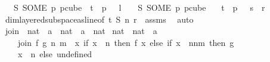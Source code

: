 \begin{isabellebody}
\ \ {\isasymchi}\ {\isacharparenleft}{\kern0pt}S\ {\isacharparenleft}{\kern0pt}SOME\ p{\isachardot}{\kern0pt}\ p{\isasymin}cube\ {}\ {\isacharparenleft}{\kern0pt}t{\isacharplus}{\kern0pt}{}{\isacharparenright}{\kern0pt}\ {\isasymand}\ p\ {}\ {\isacharequal}{\kern0pt}\ l{\isacharparenright}{\kern0pt}{\isacharparenright}{\kern0pt}\ {\isasymand}\ \ {\isasymchi}\ {\isacharparenleft}{\kern0pt}S\ {\isacharparenleft}{\kern0pt}SOME\ p{\isachardot}{\kern0pt}\ p{\isasymin}cube\ {}\isanewline
\ \ {\isacharparenleft}{\kern0pt}t{\isacharplus}{\kern0pt}{}{\isacharparenright}{\kern0pt}\ {\isasymand}\ p\ {}\ {\isacharequal}{\kern0pt}\ s{\isacharparenright}{\kern0pt}{\isacharparenright}{\kern0pt}\ {\isacharless}{\kern0pt}\ r{\isachardoublequoteclose}\isanewline
%
\isadelimproof
\ \ %
\endisadelimproof
%
\isatagproof
{}\isamarkupfalse%
\ dim{}{\isacharunderscore}{\kern0pt}layered{\isacharunderscore}{\kern0pt}subspace{\isacharunderscore}{\kern0pt}as{\isacharunderscore}{\kern0pt}line{\isacharbrackleft}{\kern0pt}of\ t\ S\ n\ r\ {\isasymchi}{\isacharbrackright}{\kern0pt}\ assms\ \isamarkupfalse%
\ auto%
\endisatagproof
{\isafoldproof}%
%
\isadelimproof
\ \ \isanewline
%
\endisadelimproof
\isanewline
{}\isamarkupfalse%
\ join\ {\isacharcolon}{\kern0pt}{\isacharcolon}{\kern0pt}\ {\isachardoublequoteopen}{\isacharparenleft}{\kern0pt}nat\ {\isasymRightarrow}\ {\isacharprime}{\kern0pt}a{\isacharparenright}{\kern0pt}\ {\isasymRightarrow}\ {\isacharparenleft}{\kern0pt}nat\ {\isasymRightarrow}\ {\isacharprime}{\kern0pt}a{\isacharparenright}{\kern0pt}\ {\isasymRightarrow}\ nat\isanewline
{\isasymRightarrow}\ nat\ {\isasymRightarrow}\ {\isacharparenleft}{\kern0pt}nat\ {\isasymRightarrow}\ {\isacharprime}{\kern0pt}a{\isacharparenright}{\kern0pt}{\isachardoublequoteclose}\isanewline
\ \ \isanewline
\ \ \ \ {\isachardoublequoteopen}join\ f\ g\ n\ m\ {\isasymequiv}\ {\isacharparenleft}{\kern0pt}{\isasymlambda}x{\isachardot}{\kern0pt}\ if\ x\ {\isasymin}\ {\isacharbraceleft}{\kern0pt}{\isachardot}{\kern0pt}{\isachardot}{\kern0pt}{\isacharless}{\kern0pt}n{\isacharbraceright}{\kern0pt}\ then\ f\ x\ else\ {\isacharparenleft}{\kern0pt}if\ x\ {\isasymin}\ {\isacharbraceleft}{\kern0pt}n{\isachardot}{\kern0pt}{\isachardot}{\kern0pt}{\isacharless}{\kern0pt}n{\isacharplus}{\kern0pt}m{\isacharbraceright}{\kern0pt}\ then\ g\isanewline
\ \ \ \ {\isacharparenleft}{\kern0pt}x\ {\isacharminus}{\kern0pt}\ n{\isacharparenright}{\kern0pt}\ else\ undefined{\isacharparenright}{\kern0pt}{\isacharparenright}{\kern0pt}{\isachardoublequoteclose}\isanewline

\end{isabellebody}
